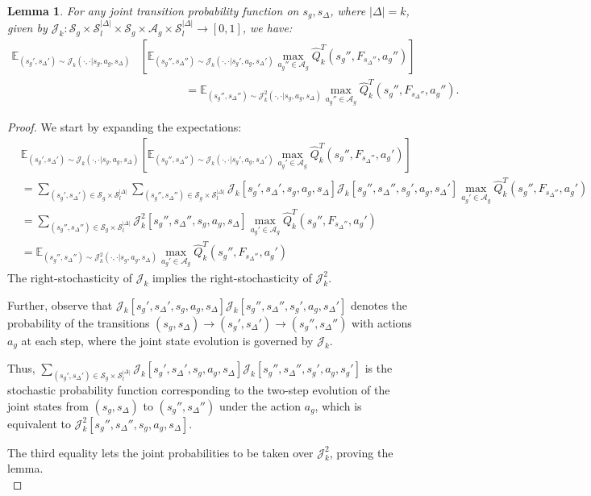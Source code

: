 \documentclass{article}
\theoremstyle{plain}
\newtheorem{lemma}[theorem]{Lemma}
\theoremstyle{definition}
\def\E{\mathbb{E}}
\begin{document}
\begin{lemma}\label{lemma: combining transition probabilities}
For any joint transition probability function on $s_g, s_\Delta$, where $|\Delta|=k$, given by $\mathcal{J}_k:\mathcal{S}_g\times\mathcal{S}_l^{|\Delta|}\times\mathcal{S}_g\times\mathcal{A}_g\times\mathcal{S}_l^{|\Delta|}\to [0,1]$, we have:
\begin{align*}
\E_{(s_g',s_\Delta')\sim\mathcal{J}_k(\cdot,\cdot|s_g,a_g,s_\Delta)}&\left[\E_{(s_g'',s_\Delta'')\sim\mathcal{J}_k(\cdot,\cdot|s_g',a_g,s_\Delta')} \max_{a_g''\in\mathcal{A}_g}\hat{Q}_k^T(s_g'',F_{s_\Delta''},a_g'')\right]  \\
&\quad\quad\quad\quad = \E_{(s_g'',s_\Delta'')\sim\mathcal{J}_k^2(\cdot,\cdot|s_g,a_g,s_\Delta)} \max_{a_g''\in\mathcal{A}_g}\hat{Q}_{k}^T(s_g'',F_{s_\Delta''},a_g'').
\end{align*}
\end{lemma}
\begin{proof}
We start by expanding the expectations:
\begin{align*}
&\E_{(s_g',s_\Delta')\sim \mathcal{J}_k(\cdot,\cdot|s_g,a_g,s_\Delta)}\left[\E_{(s_g'',s_\Delta'')\sim \mathcal{J}_k(\cdot,\cdot|s_g',a_g,s_\Delta')}\max_{a_g'\in\mathcal{A}_g}\hat{Q}_k^T(s_g'',F_{s_\Delta''},a_g')\right] \\
&=   \sum_{(s_g',s_\Delta')\in\mathcal{S}_g\times\mathcal{S}_l^{|\Delta|}} \sum_{(s_g'',s_\Delta'')\in\mathcal{S}_g\times\mathcal{S}_l^{|\Delta|}}     \mathcal{J}_k[s_g',s_\Delta', s_g,a_g,s_\Delta]\mathcal{J}_k[s_g'',s_\Delta'', s_g',a_g,s_\Delta']\max_{a_g'\in\mathcal{A}_g}\hat{Q}_k^T(s_g'',F_{s_\Delta''},a_g') \\
&= \sum_{(s_g'',s_\Delta'')\in\mathcal{S}_g\times\mathcal{S}_l^{|\Delta|}}\mathcal{J}_k^2[s_g'',s_\Delta'', s_g, a_g, s_\Delta] \max_{a_g'\in\mathcal{A}_g}\hat{Q}^T_k(s_g'',F_{s_\Delta''},a_g') \\
&= \E_{(s_g'',s_\Delta'')\sim\mathcal{J}_k^2(\cdot,\cdot|s_g,a_g,s_\Delta)}\max_{a_g'\in\mathcal{A}_g}\hat{Q}_k^T(s_g'',F_{s_\Delta''},a_g')
\end{align*}
\noindent The right-stochasticity of $\mathcal{J}_k$ implies the right-stochasticity of $\mathcal{J}_k^2$. 


Further, observe that $\mathcal{J}_k[s_g',s_\Delta',s_g,a_g,s_\Delta]\mathcal{J}_k[s_g'',s_\Delta'',s_g',a_g,s_\Delta']$ denotes the probability of the transitions $(s_g,s_\Delta)\to (s_g',s_\Delta')\to (s_g'',s_\Delta'')$ with actions $a_g$ at each step, where the joint state evolution is governed by $\mathcal{J}_k$.

Thus, $\sum_{(s_g',s_\Delta')\in\mathcal{S}_g\times\mathcal{S}_l^{|\Delta|}}\mathcal{J}_k[s_g',s_\Delta',s_g,a_g,s_\Delta]\mathcal{J}_k[s_g'',s_\Delta'',s_g', a_g, s_g']$ is the stochastic probability function corresponding to the two-step evolution of the joint states from $(s_g,s_\Delta)$ to $(s_g'',s_\Delta'')$ under the action $a_g$, which is equivalent to $\mathcal{J}_k^2[s_g'',s_\Delta'',s_g,a_g,s_\Delta]$. 

The third equality lets the joint probabilities to be taken over $\mathcal{J}_k^2$, proving the lemma. \qedhere\\
\end{proof}
\end{document}

